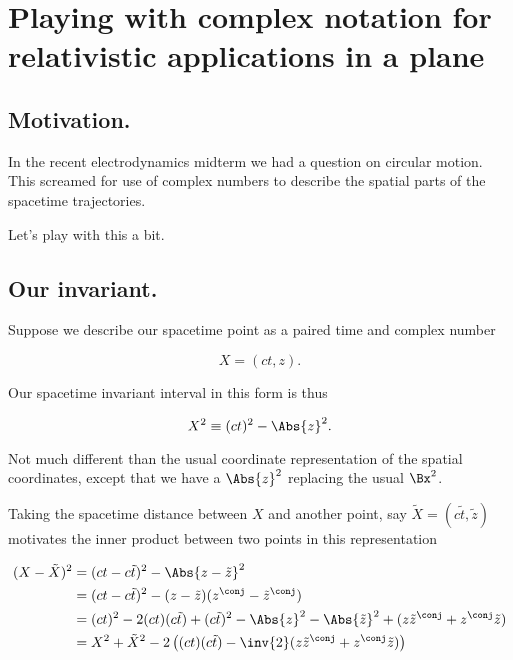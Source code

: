 
%

\chapter{Playing with complex notation for relativistic applications in a plane}
\label{chap:complexPlanarBoost}
{}
\date{Mar 8, 2011}

\beginArtWithToc

\section{Motivation.}

In the recent electrodynamics midterm we had a question on circular motion.  This screamed for use of complex numbers to describe the spatial parts of the spacetime trajectories.

Let's play with this a bit.

\section{Our invariant.}

Suppose we describe our spacetime point as a paired time and complex number

\begin{equation}\label{eqn:complexPlanarBoost:n}
X = (ct, z).
\end{equation}

Our spacetime invariant interval in this form is thus

\begin{equation}\label{eqn:complexPlanarBoost:n}
X^2 \equiv (ct)^2 - \Abs{z}^2.
\end{equation}

Not much different than the usual coordinate representation of the spatial coordinates, except that we have a $\Abs{z}^2$ replacing the usual $\Bx^2$.

Taking the spacetime distance between $X$ and another point, say $\tilde{X} = ( c \tilde{t}, \tilde{z})$ motivates the inner product between two points in this representation

\begin{align*}
(X - \tilde{X})^2 
&= (ct - c \tilde{t})^2 - \Abs{z - \tilde{z}}^2 \\
&= (ct - c \tilde{t})^2 - (z - \tilde{z})(z^\conj - \tilde{z}^\conj) \\
&= (ct)^2 - 2 (ct) (c \tilde{t}) + (c \tilde{t})^2 
- \Abs{z}^2 - \Abs{\tilde{z}}^2 + (z \tilde{z}^\conj + z^\conj \tilde{z}) \\
&= X^2 + \tilde{X}^2 - 2 \left( (ct) (c \tilde{t}) - \inv{2}(z \tilde{z}^\conj + z^\conj \tilde{z}) \right) \\
\end{align*}


